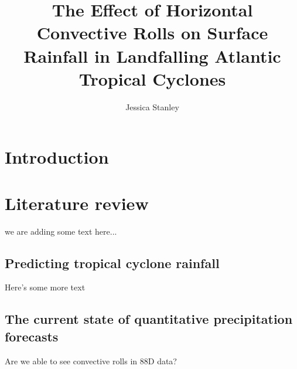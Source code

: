 \documentclass[12pt]{article}
\author{Jessica Stanley} \title{The Effect of Horizontal Convective Rolls on Surface Rainfall in Landfalling Atlantic Tropical Cyclones}
\begin{document}
\maketitle


\section{Introduction}

\section{Literature review}

we are adding some text here...

\subsection{Predicting tropical cyclone rainfall} 

Here's some more text

\subsection{The current state of quantitative precipitation forecasts}

Are we able to see convective rolls in 88D data?
\end{document}

